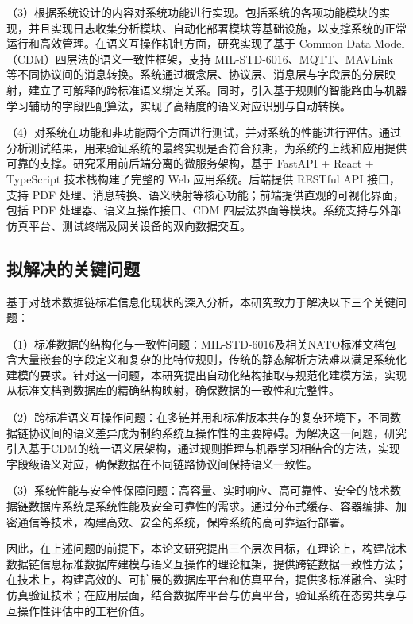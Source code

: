 （3）根据系统设计的内容对系统功能进行实现。包括系统的各项功能模块的实现，并且实现日志收集分析模块、自动化部署模块等基础设施，以支撑系统的正常运行和高效管理。在语义互操作机制方面，研究实现了基于 Common Data Model（CDM）四层法的语义一致性框架，支持 MIL-STD-6016、MQTT、MAVLink 等不同协议间的消息转换\cite{Hamdan2023Reference,MITRE_Link16_Interoperability_2024}。系统通过概念层、协议层、消息层与字段层的分层映射，建立了可解释的跨标准语义绑定关系。同时，引入基于规则的智能路由与机器学习辅助的字段匹配算法，实现了高精度的语义对应识别与自动转换。

（4）对系统在功能和非功能两个方面进行测试，并对系统的性能进行评估。通过分析测试结果，用来验证系统的最终实现是否符合预期，为系统的上线和应用提供可靠的支撑。研究采用前后端分离的微服务架构，基于 FastAPI + React + TypeScript 技术栈构建了完整的 Web 应用系统\cite{Waseem2021Design,MonitoringTools2024}。后端提供 RESTful API 接口，支持 PDF 处理、消息转换、语义映射等核心功能；前端提供直观的可视化界面，包括 PDF 处理器、语义互操作接口、CDM 四层法界面等模块。系统支持与外部仿真平台、测试终端及网关设备的双向数据交互\cite{SAIC_JRE_Overview_2021,Collins_TTR_2021,L3Harris_STT_KOR24A_2020}。


\subsection{拟解决的关键问题}

基于对战术数据链标准信息化现状的深入分析，本研究致力于解决以下三个关键问题：

（1）标准数据的结构化与一致性问题：MIL-STD-6016及相关NATO标准文档包含大量嵌套的字段定义和复杂的比特位规则，传统的静态解析方法难以满足系统化建模的要求\cite{MIL_STD_6016_Active_2024,SISO_STD_002_2006}。针对这一问题，本研究提出自动化结构抽取与规范化建模方法，实现从标准文档到数据库的精确结构映射，确保数据的一致性和完整性。

（2）跨标准语义互操作问题：在多链并用和标准版本共存的复杂环境下，不同数据链协议间的语义差异成为制约系统互操作性的主要障碍\cite{Hamdan2023Reference,MITRE_Link16_Interoperability_2024}。为解决这一问题，研究引入基于CDM的统一语义层架构，通过规则推理与机器学习相结合的方法，实现字段级语义对应，确保数据在不同链路协议间保持语义一致性。

（3）系统性能与安全性保障问题：高容量、实时响应、高可靠性、安全的战术数据链数据库系统是系统性能及安全可靠性的需求\cite{Waseem2021Design,MonitoringTools2024}。通过分布式缓存、容器编排、加密通信等技术，构建高效、安全的系统，保障系统的高可靠运行部署。

因此，在上述问题的前提下，本论文研究提出三个层次目标，在理论上，构建战术数据链信息标准数据库建模与语义互操作的理论框架，提供跨链数据一致性方法；在技术上，构建高效的、可扩展的数据库平台和仿真平台，提供多标准融合、实时仿真验证技术；在应用层面，结合数据库平台与仿真平台，验证系统在态势共享与互操作性评估中的工程价值\cite{SAIC_JRE_Overview_2021,CurtissWright_TCG_HUNTR_2020,DOTE_2022_MIDS_LVT}。

